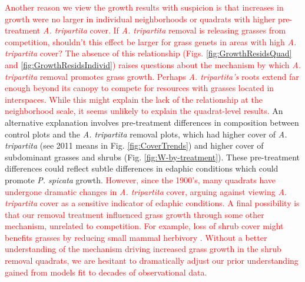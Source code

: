 \documentclass[11pt]{article}
\newcommand{\new}{\textcolor{red}}
\begin{document}
\begin{doublespacing}
\new{Another reason we view the growth results with suspicion is that increases in growth were no larger in individual neighborhoods or quadrats with higher pre-treatment \textit{A. tripartita} cover. If \textit{A. tripartita} removal is releasing grasses from competition, shouldn't this effect be larger for grass genets in areas with high \textit{A. tripartita} cover? The absence of this relationship (Figs. \ref{fig:GrowthResidsQuad} and \ref{fig:GrowthResidsIndivid}) raises questions about the mechanism by which \textit{A. tripartita} removal promotes grass growth. Perhaps \textit{A. tripartita's} roots extend far enough beyond its canopy to compete for resources with grasses located in interspaces. While this might explain the lack of the relationship at the neighborhood scale, it seems unlikely to explain the quadrat-level results.}
An alternative explanation involves pre-treatment differences in composition between control plots and  the \textit{A. tripartita} removal plots, which had higher cover of \textit{A. tripartita} (see 2011 means in Fig. \ref{fig:CoverTrends}) and higher cover of subdominant grasses and shrubs (Fig. \ref{fig:W-by-treatment}). These pre-treatment differences could reflect subtle differences in edaphic conditions which could promote \textit{P. spicata} growth. \new{However, since the 1900's, many quadrats have undergone dramatic changes in \textit{A. tripartita} cover, arguing against viewing \textit{A. tripartita} cover as a sensitive indicator of edaphic conditions. 
A final possibility is that our removal treatment influenced grass growth through some other mechanism, unrelated to competition. 
For example, loss of shrub cover might benefits grasses by reducing small mammal herbivory \citep{Orrock2010}. 
Without a better understanding of the mechanism driving increased grass growth in the shrub removal quadrats, 
we are hesitant to dramatically adjust our prior understanding gained from models fit to decades of observational data.  }


\end{doublespacing}
\end{document}
